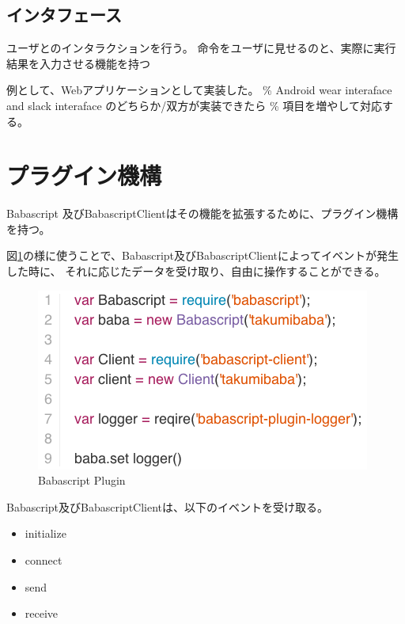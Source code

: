 \subsection{インタフェース}\label{ux30a4ux30f3ux30bfux30d5ux30a7ux30fcux30b9}

ユーザとのインタラクションを行う。
命令をユーザに見せるのと、実際に実行結果を入力させる機能を持つ

例として、Webアプリケーションとして実装した。 \% Android wear interaface
and slack interaface のどちらか/双方が実装できたら \%
項目を増やして対応する。

\section{プラグイン機構}\label{ux30d7ux30e9ux30b0ux30a4ux30f3ux6a5fux69cb}

Babascript
及びBabascriptClientはその機能を拡張するために、プラグイン機構を持つ。

図\ref{fig:babascript_plugin}の様に使うことで、Babascript及びBabascriptClientによってイベントが発生した時に、
それに応じたデータを受け取り、自由に操作することができる。

\begin{figure}[htbp]
  \begin{center}
  \includegraphics[width=.7\linewidth,bb=0 0 416 226]{images/babascript_plugin.js.png}
  \end{center}
  \caption{Babascript Plugin}
  \label{fig:babascript_plugin}
\end{figure}

Babascript及びBabascriptClientは、以下のイベントを受け取る。

\begin{itemize}
\itemsep1pt\parskip0pt
\item
  initialize
\item
  connect
\item
  send
\item
  receive
\end{itemize}

